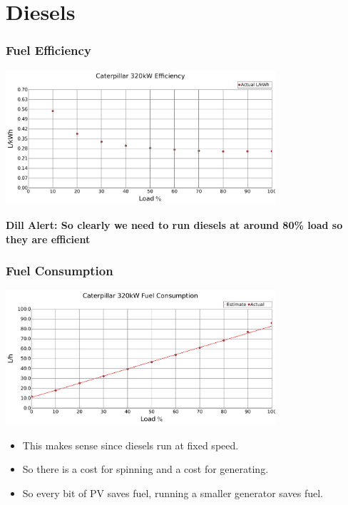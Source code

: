\documentclass{beamer}
\def\dill#1{\textcolor{RawSienna}{\textbf{Dill Alert: #1}}}
\begin{document}
\section{Diesels}
\begin{frame}\frametitle{Fuel Efficiency}
\includegraphics[width=10cm]{limits/figFuelCurve1.pdf}
\pause

\dill{So clearly we need to run diesels at around 80\% load 
  so they are efficient}
\end{frame}

\begin{frame}\frametitle{Fuel Consumption}
\includegraphics[width=10cm]{limits/figFuelCurve2.pdf}
\pause

\begin{itemize}
\item This makes sense since diesels run at fixed speed.
\pause
\item So there is a cost for spinning and a cost for generating.
\pause
\item So every bit of PV saves fuel, running a smaller generator
  saves fuel.
\end{itemize}
\end{frame}
\end{document}
